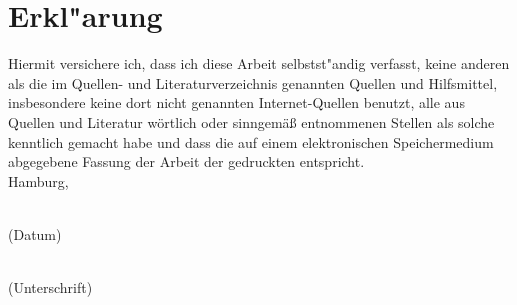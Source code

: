 \section*{Erkl"arung}
Hiermit versichere ich, dass ich diese Arbeit selbstst"andig verfasst,
keine anderen als die im Quellen- und Literaturverzeichnis genannten Quellen
und Hilfsmittel, insbesondere keine dort nicht genannten Internet-Quellen
benutzt,
alle aus Quellen und Literatur wörtlich oder sinngemäß entnommenen Stellen als
solche kenntlich gemacht habe und dass die auf einem elektronischen
Speichermedium abgegebene Fassung der Arbeit der gedruckten entspricht.
\vspace{1.5cm}\\
Hamburg,\\[-1ex]
\mbox{}\hspace{2.2cm}\parbox[t]{4cm}{\centering \dotfill\\(Datum)}\hspace{0.5cm}
                    \parbox[t]{8cm}{\centering \dotfill\\(Unterschrift)}
\cleardoublepage


\cleardoublepage
\tableofcontents
\cleardoublepage
